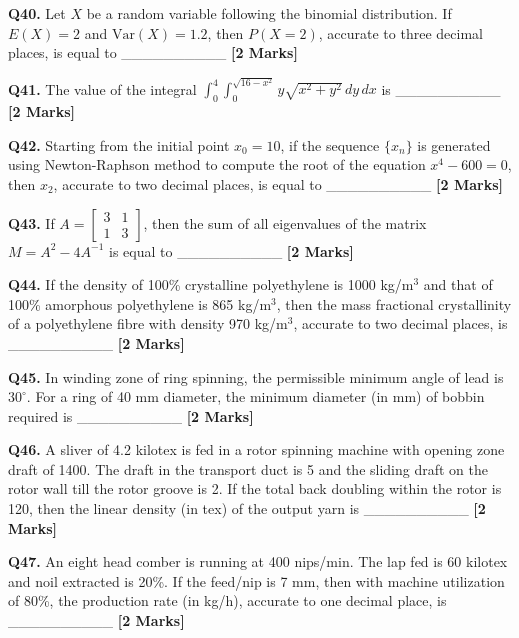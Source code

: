 \documentclass[11pt]{article}
\newcommand{\questionb}[2]{
    \noindent\textbf{Q#2.} #1 \hfill \textbf{[2 Marks]}
}
\begin{document}
\questionb{Let \( X \) be a random variable following the binomial distribution. If \( E(X) = 2 \) and \( \text{Var}(X) = 1.2 \), then \( P(X = 2) \), accurate to three decimal places, is equal to \_\_\_\_\_\_\_\_\_\_}{40}
\vspace{0.5cm}

\questionb{The value of the integral \( \int_{0}^{4} \int_{0}^{\sqrt{16 - x^2}} y \sqrt{x^2 + y^2} \, dy \, dx \) is \_\_\_\_\_\_\_\_\_\_}{41}
\vspace{0.5cm}

\questionb{Starting from the initial point \( x_0 = 10 \), if the sequence \(\{x_n\}\) is generated using Newton-Raphson method to compute the root of the equation \( x^4 - 600 = 0 \), then \( x_2 \), accurate to two decimal places, is equal to \_\_\_\_\_\_\_\_\_\_}{42}
\vspace{0.5cm}

\questionb{If \( A = \begin{bmatrix} 3 & 1 \\ 1 & 3 \end{bmatrix} \), then the sum of all eigenvalues of the matrix \( M = A^2 - 4A^{-1} \) is equal to \_\_\_\_\_\_\_\_\_\_}{43}
\vspace{0.5cm}

\questionb{If the density of 100\% crystalline polyethylene is 1000 kg/m\(^3\) and that of 100\% amorphous polyethylene is 865 kg/m\(^3\), then the mass fractional crystallinity of a polyethylene fibre with density 970 kg/m\(^3\), accurate to two decimal places, is \_\_\_\_\_\_\_\_\_\_}{44}
\vspace{0.5cm}

\questionb{In winding zone of ring spinning, the permissible minimum angle of lead is \(30^\circ\). For a ring of 40 mm diameter, the minimum diameter (in mm) of bobbin required is \_\_\_\_\_\_\_\_\_\_}{45}
\vspace{0.5cm}

\questionb{A sliver of 4.2 kilotex is fed in a rotor spinning machine with opening zone draft of 1400. The draft in the transport duct is 5 and the sliding draft on the rotor wall till the rotor groove is 2. If the total back doubling within the rotor is 120, then the linear density (in tex) of the output yarn is \_\_\_\_\_\_\_\_\_\_}{46}
\vspace{0.5cm}

\questionb{An eight head comber is running at 400 nips/min. The lap fed is 60 kilotex and noil extracted is 20\%. If the feed/nip is 7 mm, then with machine utilization of 80\%, the production rate (in kg/h), accurate to one decimal place, is \_\_\_\_\_\_\_\_\_\_}{47}
\vspace{0.5cm}
\end{document}
